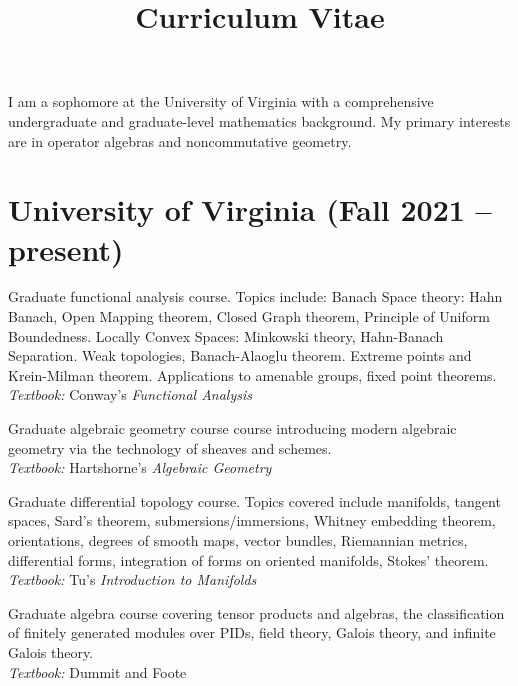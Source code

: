 \documentclass[11pt,letterpaper,sans]{moderncv}
\title{Curriculum Vitae}
\begin{document}
\makecvtitle %
\vspace*{-1.5em}



\begin{center}
  I am a sophomore at the University of Virginia with a comprehensive undergraduate and graduate-level mathematics background. My primary interests are in operator algebras and noncommutative geometry.
\end{center}

\section{University of Virginia (Fall 2021 -- present)}

%
  {Graduate functional analysis course. Topics include: Banach Space theory: Hahn Banach, Open Mapping theorem, Closed Graph theorem, Principle of Uniform Boundedness. Locally Convex Spaces: Minkowski theory, Hahn-Banach Separation. Weak topologies, Banach-Alaoglu theorem. Extreme points and Krein-Milman theorem. Applications to amenable groups, fixed point theorems. \\ \emph{Textbook: }Conway's \emph{Functional Analysis}}

%
  {Graduate algebraic geometry course course introducing modern algebraic geometry via the technology of sheaves and schemes.  \\ \emph{Textbook: }Hartshorne's \emph{Algebraic Geometry}}

%
  {Graduate differential topology course. Topics covered include manifolds, tangent spaces, Sard's theorem, submersions/immersions, Whitney embedding theorem, orientations, degrees of smooth maps, vector bundles, Riemannian metrics, differential forms, integration of forms on oriented manifolds, Stokes' theorem. \\ \emph{Textbook: }Tu's \emph{Introduction to Manifolds}}

%
  {Graduate algebra course covering tensor products and algebras, the classification of finitely generated modules over PIDs, field theory, Galois theory, and infinite Galois theory.  \\ \emph{Textbook: }Dummit and Foote}
\end{document}
